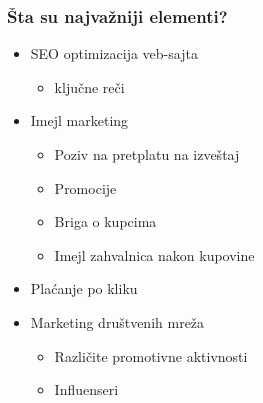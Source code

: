 \documentclass{beamer}
\begin{document}
\begin{frame}[fragile]\frametitle{ Šta su najvažniji elementi?}
	\begin{itemize}	
		\item SEO optimizacija veb-sajta 
		\begin{itemize}
		    \item \large  ključne reči
		\end{itemize}
			\item Imejl marketing
			\begin{itemize}
			    \item Poziv na pretplatu na izveštaj
			    \item Promocije
			    \item Briga o kupcima
			    \item Imejl zahvalnica nakon kupovine
			\end{itemize}
			\item Plaćanje po kliku
			\item Marketing društvenih mreža
			\begin{itemize}
			    \item Različite promotivne aktivnosti
			    \item Influenseri
			\end{itemize}
	\end{itemize}
\end{frame}
\end{document}
